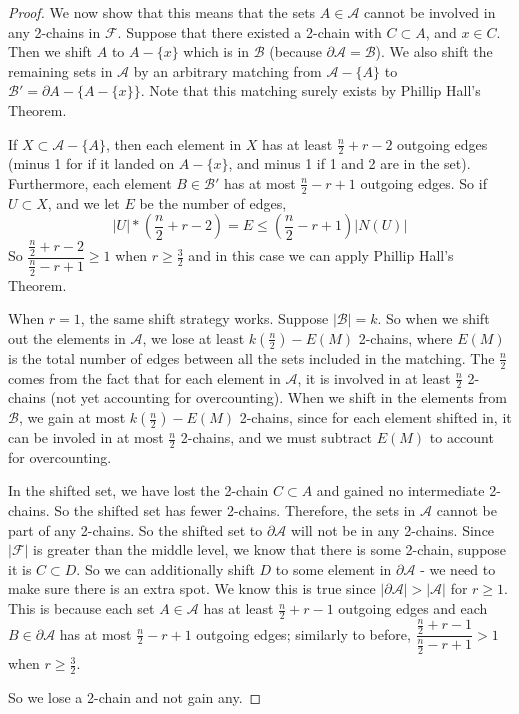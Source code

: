 \documentclass[12pt]{article}
\theoremstyle{plain}
\theoremstyle{definition}
\theoremstyle{remark}
\newcommand{\F}{\mathcal{F}}
\newcommand{\A}{\mathcal{A}}
\newcommand{\B}{\mathcal{B}}
\begin{document}
\begin{proof}
We now show that this means that the sets $A \in \A$ cannot be involved in any 2-chains in $\F$. Suppose that there existed a 2-chain with $C \subset A$, and $x \in C$. Then we shift $A$ to $A - \{ x \}$ which is in $\B$ (because $\partial \A = \B$). We also shift the remaining sets in $\A$ by an arbitrary matching from $\A - \{ A \}$ to $\B' = \partial A - \{ A - \{x\} \}$. Note that this matching surely exists by Phillip Hall's Theorem. 

If $X \subset \A - \{ A \}$, then each element in $X$ has at least $\frac{n}{2} + r - 2$ outgoing edges (minus 1 for if it landed on $A - \{x\}$, and minus 1 if 1 and 2 are in the set). Furthermore, each element $B \in \B'$ has at most $\frac{n}{2} - r + 1$ outgoing edges. So if $U \subset X$, and we let $E$ be the number of edges,
\[ |U|*(\frac{n}{2}+r-2) = E \leq (\frac{n}{2}-r+1)|N(U)| \]
So $\dfrac{\frac{n}{2}+r-2}{\frac{n}{2}-r+1} \geq 1$ when $r \geq \frac{3}{2}$ and in this case we can apply Phillip Hall's Theorem. 

When $r =1$, the same shift strategy works. Suppose $|\B| = k$. So when we shift out the elements in $\A$, we lose at least $k(\frac{n}{2}) - E(M)$ 2-chains, where $E(M)$ is the total number of edges between all the sets included in the matching. The $\frac{n}{2}$ comes from the fact that for each element in $\A$, it is involved in at least $\frac{n}{2}$ 2-chains (not yet accounting for overcounting). When we shift in the elements from $\B$, we gain at most $k(\frac{n}{2}) - E(M)$ 2-chains, since for each element shifted in, it can be involed in at most $\frac{n}{2}$ 2-chains, and we must subtract $E(M)$ to account for overcounting.

In the shifted set, we have lost the 2-chain $C \subset A$ and gained no intermediate 2-chains. So the shifted set has fewer 2-chains. Therefore, the sets in $\A$ cannot be part of any 2-chains. So the shifted set to $\partial \A$ will not be in any 2-chains. Since $|\F|$ is greater than the middle level, we know that there is some 2-chain, suppose it is $C \subset D$. So we can additionally shift $D$ to some element in $\partial \A$ - we need to make sure there is an extra spot. We know this is true since $|\partial \A| > |\A|$ for $r \geq 1$. This is because each set $A \in \A$ has at least $\frac{n}{2}+r-1$ outgoing edges and each $B \in \partial \A$ has at most $\frac{n}{2}-r+1$ outgoing edges; similarly to before, $\dfrac{\frac{n}{2}+r-1}{\frac{n}{2}-r+1} > 1$ when $r \geq \frac{3}{2}$. 

So we lose a 2-chain and not gain any. 


\end{proof}
\end{document}
